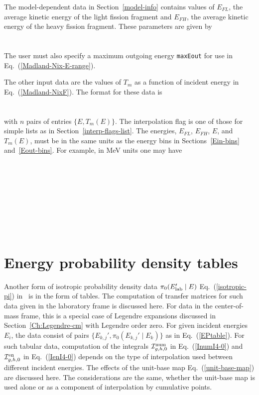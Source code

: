The model-dependent data in Section~\ref{model-info}
contains values of $E_{FL}$, the average kinetic energy of the
light fission fragment and $E_{FH}$, the average kinetic energy of the
heavy fission fragment.  These parameters are given by\\
  \\
  \\
The user must also specify a maximum outgoing energy 
\texttt{maxEout} for use in Eq.~(\ref{Madland-Nix-E-range}).
 
The other input data are the values of $T_m$ as a function of
incident energy in
Eq.~(\ref{Madland-NixF}).  The format for these data is\\
  \\
  \\
with $n$ pairs of entries $\{E, T_m(E)\}$.  
The interpolation flag is one of those for simple lists as in 
Section~\ref{interp-flags-list}.
The energies, $E_{FL}$, $E_{FH}$, $E$, and $T_m(E)$, must be in the same
units as the energy bins in Sections~\ref{Ein-bins} and~\ref{Eout-bins}.
For example, in MeV units one may have\\
  \\
  \\
  \\
  \\
  \\
  \\
  \\
  \Input{}{ $\cdots$}\\

\section{Energy probability density tables}\label{Sec:isotropicTables}
Another form of isotropic probability density data $\pi_0(E_{\text{lab}}'  \mid E)$
Eq.~(\ref{isotropic-pi}) in \xendl\ is in the form of tables.  The computation
of transfer matrices for such data given in the laboratory frame is
discussed here.  For data in the center-of-mass frame, this is a
special case of Legendre expansions discussed in Section~\ref{Ch:Legendre-cm}
with Legendre order zero.
For given
incident energies $E_i$, the data consist of pairs 
$\{E_{k,j}', \pi_0(E_{k,j}' \mid E_k)\}$ as in Eq.~(\ref{EPtable}).
For such tabular data,
computation of the integrals ${\cal I}^{\text{num}}_{g,h,0}$ in Eq.~(\ref{InumI4-0})
and ${\cal I}^{\text{en}}_{g,h,0}$ in Eq.~(\ref{IenI4-0}) depends on the type
of interpolation used between
different incident energies.
The effects of the unit-base map Eq.~(\ref{unit-base-map}) are
discussed here.  The considerations are the same, whether the
unit-base map is used alone or as a component of interpolation
by cumulative points.

